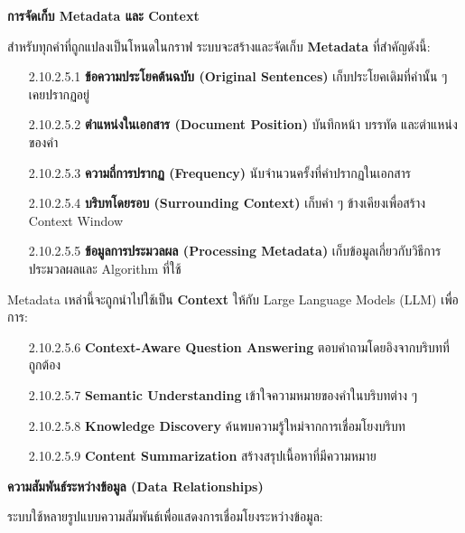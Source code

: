 \documentclass[12pt,a4paper]{article}
\begin{document}
\begin{enumerate}[leftmargin=2cm]
\begin{enumerate}
{\begin{enumerate}
            \vspace{0.3cm}

            \textbf{การจัดเก็บ Metadata และ Context}

            \hspace{1cm}สำหรับทุกคำที่ถูกแปลงเป็นโหนดในกราฟ ระบบจะสร้างและจัดเก็บ \textbf{Metadata} ที่สำคัญดังนี้:

            \begin{enumerate}
                \item[2.10.2.5.1] \textbf{ข้อความประโยคต้นฉบับ (Original Sentences)} เก็บประโยคเดิมที่คำนั้น ๆ เคยปรากฏอยู่
                \item[2.10.2.5.2] \textbf{ตำแหน่งในเอกสาร (Document Position)} บันทึกหน้า บรรทัด และตำแหน่งของคำ
                \item[2.10.2.5.3] \textbf{ความถี่การปรากฏ (Frequency)} นับจำนวนครั้งที่คำปรากฏในเอกสาร
                \item[2.10.2.5.4] \textbf{บริบทโดยรอบ (Surrounding Context)} เก็บคำ ๆ ข้างเคียงเพื่อสร้าง Context Window
                \item[2.10.2.5.5] \textbf{ข้อมูลการประมวลผล (Processing Metadata)} เก็บข้อมูลเกี่ยวกับวิธีการประมวลผลและ Algorithm ที่ใช้
            \end{enumerate}

            Metadata เหล่านี้จะถูกนำไปใช้เป็น \textbf{Context} ให้กับ Large Language Models (LLM) เพื่อการ:

            \begin{enumerate}
                \item[2.10.2.5.6] \textbf{Context-Aware Question Answering} ตอบคำถามโดยอิงจากบริบทที่ถูกต้อง
                \item[2.10.2.5.7] \textbf{Semantic Understanding} เข้าใจความหมายของคำในบริบทต่าง ๆ
                \item[2.10.2.5.8] \textbf{Knowledge Discovery} ค้นพบความรู้ใหม่จากการเชื่อมโยงบริบท
                \item[2.10.2.5.9] \textbf{Content Summarization} สร้างสรุปเนื้อหาที่มีความหมาย
            \end{enumerate}

            \vspace{0.3cm}

            \textbf{ความสัมพันธ์ระหว่างข้อมูล (Data Relationships)}

            \hspace{1cm}ระบบใช้หลายรูปแบบความสัมพันธ์เพื่อแสดงการเชื่อมโยงระหว่างข้อมูล:


\end{enumerate}}
\end{enumerate}
\end{enumerate}
\end{document}
